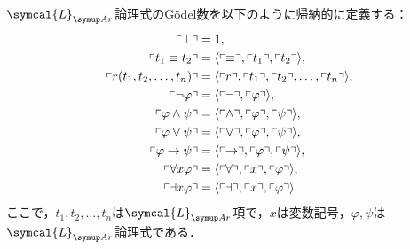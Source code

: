 \begin{Def}[論理式のGödel数] \label{Def:formulaGodelNumber}
	\(\symcal{L}_{\Ar}\)論理式のGödel数を以下のように帰納的に定義する：
	\begin{align}
		\GodelNumber{\bot}                            & = 1,
		\label{eq:botGodelNumber}                                                                                                                              \\
		\GodelNumber{t_1 \objeq t_2}                  & = \finitesequencecode{\symbolcode{\objeq}, \GodelNumber{t_1}, \GodelNumber{t_2}},
		\label{eq:equationGodelNumber}                                                                                                                         \\
		\GodelNumber{\apply{r}{t_1, t_2, \dots, t_n}} & = \finitesequencecode{\symbolcode{r}, \GodelNumber{t_1}, \GodelNumber{t_2}, \dots, \GodelNumber{t_n}},
		\label{eq:relationalsymbolGodelNumber}                                                                                                                 \\
		\GodelNumber{\lnot\varphi}                    & = \finitesequencecode{\symbolcode{\lnot}, \GodelNumber{\varphi}},
		\label{eq:lnotGodelNumber}                                                                                                                             \\
		\GodelNumber{\varphi \land \psi}              & = \finitesequencecode{\symbolcode{\land}, \GodelNumber{\varphi}, \GodelNumber{\psi}},
		\label{eq:landGodelNumber}                                                                                                                             \\
		\GodelNumber{\varphi \lor \psi}               & = \finitesequencecode{\symbolcode{\lor}, \GodelNumber{\varphi}, \GodelNumber{\psi}},
		\label{eq:lorGodelNumber}                                                                                                                              \\
		\GodelNumber{\varphi \to \psi}                & = \finitesequencecode{\symbolcode{\to}, \GodelNumber{\varphi}, \GodelNumber{\psi}},
		\label{eq:toGodelNumber}                                                                                                                               \\
		\GodelNumber{\forall x \varphi}               & = \finitesequencecode{\symbolcode{\forall}, \symbolcode{x}, \GodelNumber{\varphi}},
		\label{eq:forallGodelNumber}                                                                                                                           \\
		\GodelNumber{\exists x \varphi}               & = \finitesequencecode{\symbolcode{\exists}, \symbolcode{x}, \GodelNumber{\varphi}}.
		\label{eq:existsGodelNumber}
	\end{align}
	ここで，\(t_1, t_2, \dots, t_n\)は\(\symcal{L}_{\Ar}\)項で，\(x\)は変数記号，\(\varphi, \psi\)は\(\symcal{L}_{\Ar}\)論理式である．
\end{Def}

